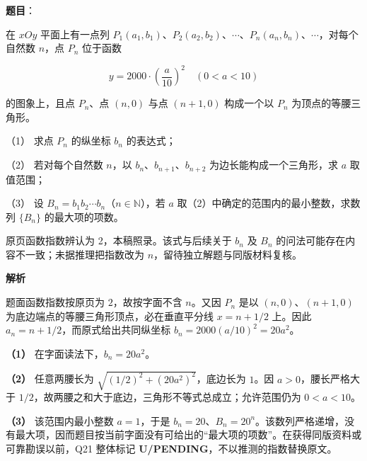 \begin{answer}

\textbf{题目}：

在 $xOy$ 平面上有一点列 $P_1(a_1,b_1)$、$P_2(a_2,b_2)$、$\cdots$、$P_n(a_n,b_n)$、$\cdots$，对每个自然数 $n$，点 $P_n$ 位于函数

\nopagebreak[4]
\[
y=2000\cdot\left(\dfrac{a}{10}\right)^2\quad(0<a<10)
\]

的图象上，且点 $P_n$、点 $(n,0)$ 与点 $(n+1,0)$ 构成一个以 $P_n$ 为顶点的等腰三角形。

（1） 求点 $P_n$ 的纵坐标 $b_n$ 的表达式；

（2） 若对每个自然数 $n$，以 $b_n$、$b_{n+1}$、$b_{n+2}$ 为边长能构成一个三角形，求 $a$ 取值范围；

（3） 设 $B_n=b_1b_2\cdots b_n$（$n\in\mathbb{N}$），若 $a$ 取（2）中确定的范围内的最小整数，求数列 $\{B_n\}$ 的最大项的项数。

\begin{gktip}
原页函数指数辨认为 2，本稿照录。该式与后续关于 $b_n$ 及 $B_n$ 的问法可能存在内容不一致；未据推理把指数改为 $n$，留待独立解题与同版材料复核。
\end{gktip}

\textbf{解析}

题面函数指数按原页为 $2$，故按字面不含 $n$。又因 $P_n$ 是以 $(n,0)$、$(n+1,0)$ 为底边端点的等腰三角形顶点，必在垂直平分线 $x=n+1/2$ 上。因此 $a_n=n+1/2$，而原式给出共同纵坐标 $b_n=2000(a/10)^2=20a^2$。

\textbf{（1）} 在字面读法下，$b_n=20a^2$。

\textbf{（2）} 任意两腰长为 $\sqrt{(1/2)^2+(20a^2)^2}$，底边长为 $1$。因 $a>0$，腰长严格大于 $1/2$，故两腰之和大于底边，三角形不等式总成立；允许范围仍为 $0<a<10$。

\textbf{（3）} 该范围内最小整数 $a=1$，于是 $b_n=20$、$B_n=20^n$。该数列严格递增，没有最大项，因而题目按当前字面没有可给出的“最大项的项数”。在获得同版资料或可靠勘误以前，Q21 整体标记 \textbf{U/PENDING}，不以推测的指数替换原文。




\end{answer}
